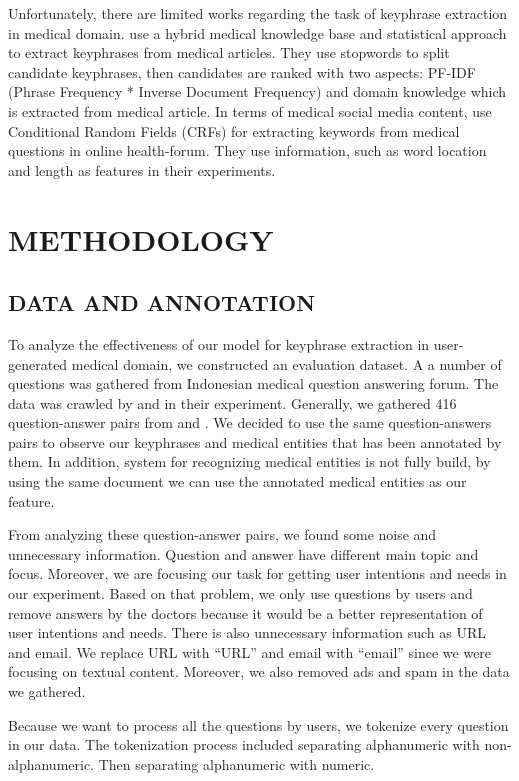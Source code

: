 Unfortunately, there are limited works regarding the task of keyphrase extraction in medical domain. \cite{ekpMedicalDocumentHybrid} use a hybrid medical knowledge base and statistical approach to extract keyphrases from medical articles. They use stopwords to split candidate keyphrases, then candidates are ranked with two aspects: PF-IDF (Phrase Frequency * Inverse Document Frequency) and domain knowledge which is extracted from medical article. In terms of medical social media content, \cite{cao2010automatically} use Conditional Random Fields (CRFs) for extracting keywords from medical questions in online health-forum. They use information, such as word location and length as features in their experiments.

\section{METHODOLOGY}
\subsection{DATA AND ANNOTATION}
To analyze the effectiveness of our model for keyphrase extraction in user-generated medical domain, we constructed an evaluation dataset. A a number of questions was gathered from Indonesian medical question answering forum. The data was crawled by \cite{skripsiKakRadit} and \cite{skripsiWahid} in their experiment. Generally, we gathered 416 question-answer pairs from \cite{skripsiKakRadit} and \cite{skripsiWahid}. We decided to use the same question-answers pairs to observe our keyphrases and medical entities that has been annotated by them. In addition, system for recognizing medical entities is not fully build, by using the same document we can use the annotated medical entities as our feature.

From analyzing these question-answer pairs, we found some noise and unnecessary information. Question and answer have different main topic and focus. Moreover, we are focusing our task for getting user intentions and needs in our experiment. Based on that problem, we only use questions by users and remove answers by the doctors because it would be a better representation of user intentions and needs. There is also unnecessary information such as URL and email. We replace URL with “URL”  and email with “email” since we were focusing on textual content. Moreover, we also removed ads and spam in the data we gathered.

Because we want to process all the questions by users, we tokenize every question in our data. The tokenization process included separating alphanumeric with non-alphanumeric. Then separating alphanumeric with numeric. 

